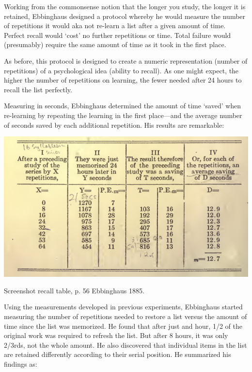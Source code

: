 \begin{refsection}
 Working from the commonsense notion that the longer you study, the longer it is retained, Ebbinghaus designed a protocol whereby he would measure the number of repetitions it would aka not re-learn a list after a given amount of time. Perfect recall would `cost' no further repetitions or time. Total failure would (presumably) require the same amount of time as it took in the first place.

As before, this protocol is designed to create a numeric representation (number of repetitions) of a psychological idea (ability to recall). As one might expect, the higher the number of repetitions on learning, the fewer needed after 24 hours to recall the list perfectly.

Measuring in seconds, Ebbinghaus determined the amount of time `saved' when re-learning by repeating the learning in the first place---and the average number of seconds saved by each additional repetition. His results are remarkable:
\begin{marginfigure}
 \begin{center}

     \includegraphics[scale=0.5]{../images/ebbinghaus2.png}
\end{center}
 \caption{Screenshot recall table, p. 56 Ebbinghaus 1885.}
\label{fig: ebbinghaus2}
\end{marginfigure}


 Using the measurements developed in previous experiments, Ebbinghaus started measuring the number of repetitions needed to restore a list versus the amount of time since the list was memorized. He found that after just and hour, 1\slash 2 of the original work was required to refresh the list. But after 8 hours, it was only 2\slash 3rds, not the whole amount. He also discovered that individual items in the list are retained differently according to their serial position. He summarized his findings as:


\end{refsection}

